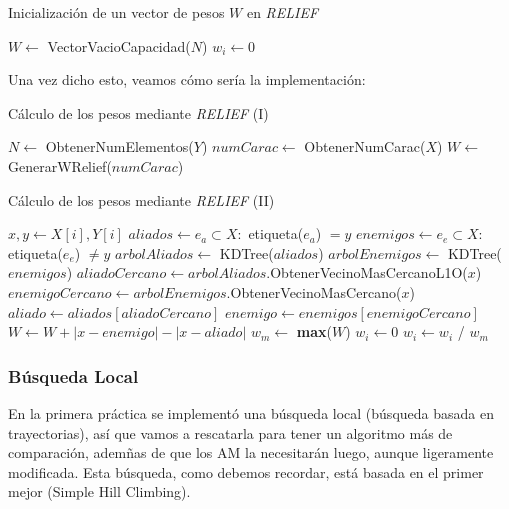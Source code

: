 \documentclass[11pt,a4paper]{article}
\begin{document}
\begin{algorithm}[H]
\caption{Inicialización de un vector de pesos $W$ en \textit{RELIEF}}
\begin{algorithmic}[1]
\State $W \gets$ VectorVacioCapacidad($N$)
	\State $w_i \gets 0$
\EndFor
\State {}
\EndFunction
\end{algorithmic}
\end{algorithm}

Una vez dicho esto, veamos cómo sería la implementación:

\begin{algorithm}[H]
\caption{Cálculo de los pesos mediante \textit{RELIEF} (I)}
\begin{algorithmic}[1]
\State $N \gets$ ObtenerNumElementos($Y$)
\State $numCarac \gets $ ObtenerNumCarac($X$)
\State $W \gets $ GenerarWRelief($numCarac$)
\end{algorithmic}
\end{algorithm}

\begin{algorithm}[H]
\caption{Cálculo de los pesos mediante \textit{RELIEF} (II)}
\begin{algorithmic}
	\State $x, y \gets X[i], Y[i]$
	\State $aliados \gets e_a \subset X :$ etiqueta($e_a$) $ = y$
	\State $enemigos \gets e_e \subset X:$ etiqueta($e_e$) $ \neq y$
	\State $arbolAliados \gets$ KDTree($aliados$)
	\State $arbolEnemigos \gets$ KDTree($enemigos$)
	\State $aliadoCercano \gets arbolAliados$.ObtenerVecinoMasCercanoL1O($x$)
	\State $enemigoCercano \gets arbolEnemigos$.ObtenerVecinoMasCercano($x$)
	\State $aliado \gets aliados[aliadoCercano]$
	\State $enemigo \gets enemigos[enemigoCercano]$
	\State $W \gets W + \left|x - enemigo\right| - \left|x - aliado\right|$
\EndFor
\State $w_m \gets$ \textbf{max}($W$)
		\State $w_i \gets 0$
	\Else
		\State $w_i \gets w_i$ / $w_m$
	\EndIf
\EndFor
\State {}
\EndFunction
\end{algorithmic}
\end{algorithm}

\newpage

\subsubsection{Búsqueda Local}

En la primera práctica se implementó una búsqueda local (búsqueda basada en trayectorias), así que vamos a rescatarla para
tener un algoritmo más de comparación, ademñas de que los AM la necesitarán luego, aunque ligeramente modificada. Esta búsqueda,
como debemos recordar, está basada en el primer mejor (Simple Hill Climbing).
\end{document}
